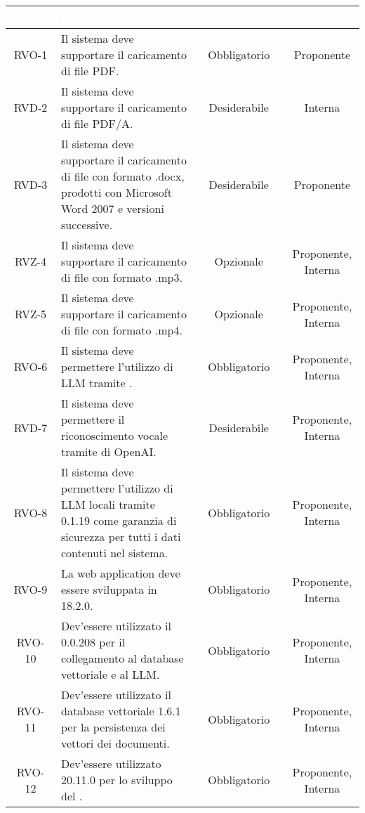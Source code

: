 \begingroup
\setlength{\tabcolsep}{10pt}
\renewcommand{\arraystretch}{1.5}
\begin{xltabular}{\textwidth}{| c | X | c | c |}
    \hline
     \textbf{\textcolor{white}{Codice}} & \textbf{\textcolor{white}{Descrizione}} & \textbf{\textcolor{white}{Classificazione}} & \textbf{\textcolor{white}{Fonte}}\\
    \hline
    \endhead
    RVO-1 & Il sistema deve supportare il caricamento di file PDF. & Obbligatorio & Proponente \\
    \hline
    RVD-2 & Il sistema deve supportare il caricamento di file PDF/A. & Desiderabile & Interna \\
    \hline
    RVD-3 & Il sistema deve supportare il caricamento di  file con formato .docx, prodotti con Microsoft Word 2007 e versioni successive. & Desiderabile & Proponente \\
    \hline
    RVZ-4 & Il sistema deve supportare il caricamento di  file con formato .mp3. & Opzionale & Proponente, Interna \\
    \hline
    RVZ-5 & Il sistema deve supportare il caricamento di  file con formato .mp4. & Opzionale & Proponente, Interna \\
    \hline
    RVO-6 & Il sistema deve permettere l'utilizzo di LLM tramite . & Obbligatorio & Proponente, Interna \\
    \hline
    RVD-7 & Il sistema deve permettere il riconoscimento vocale tramite  di OpenAI. & Desiderabile & Proponente, Interna \\
    \hline
    RVO-8 & Il sistema deve permettere l'utilizzo di LLM locali tramite  0.1.19 come garanzia di sicurezza per tutti i dati contenuti nel sistema. & Obbligatorio & Proponente, Interna \\
    \hline
    RVO-9 & La web application deve essere sviluppata in  18.2.0. & Obbligatorio & Proponente, Interna \\
    \hline
    RVO-10 & Dev'essere utilizzato il   0.0.208 per il collegamento al database vettoriale e al LLM. & Obbligatorio & Proponente, Interna \\
    \hline
    RVO-11 & Dev'essere utilizzato il database vettoriale  1.6.1 per la persistenza dei vettori  dei documenti. & Obbligatorio & Proponente, Interna \\
    \hline
    RVO-12 & Dev'essere utilizzato  20.11.0 per lo sviluppo del . & Obbligatorio & Proponente, Interna \\

\end{xltabular}
